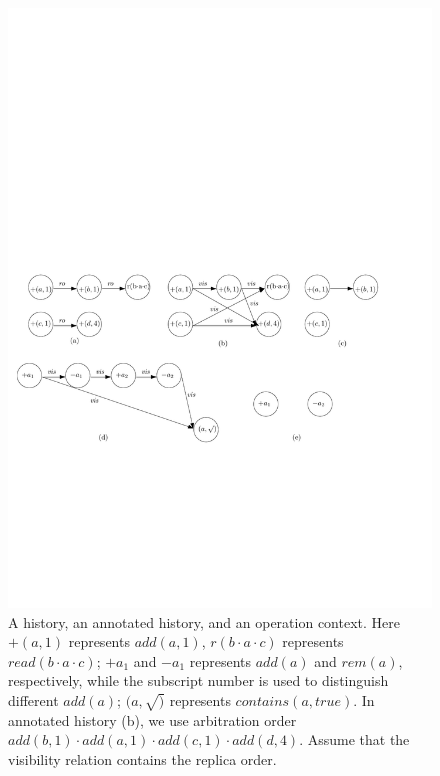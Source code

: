 \begin{figure}[t]
  \centering
  \includegraphics[width=0.75 \textwidth]{figures/PIC-his-anhis-context.pdf}
  \caption{A history, an annotated history, and an operation context. Here $+(a,1)$ represents $\mathit{add}(a,1)$, $r(b \cdot a \cdot c)$ represents $\mathit{read}(b \cdot a \cdot c)$; $+a_1$ and $-a_1$ represents $\mathit{add}(a)$ and $\mathit{rem}(a)$, respectively, while the subscript number is used to distinguish different $\mathit{add(a)}$; $(a,\surd)$ represents $\mathit{contains}(a,\mathit{true})$. In annotated history (b), we use arbitration order $\mathit{add}(b,1) \cdot \mathit{add}(a,1) \cdot \mathit{add}(c,1) \cdot \mathit{add}(d,4)$. Assume that the visibility relation contains the replica order.}
  \label{fig:history, annotated history and operation context}
\end{figure}


